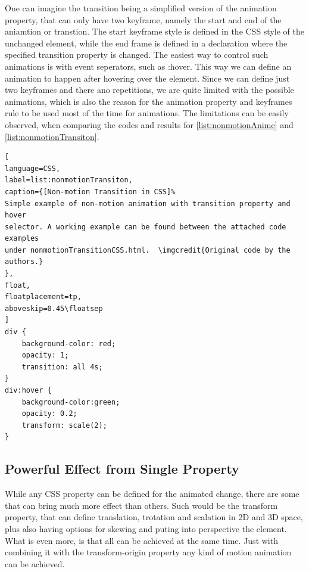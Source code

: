 One can imagine the transition being a simplified version of the animation 
property, that can only have two keyframe, namely the start and end of the 
aniamtion or transtion. The start keyframe style is defined in the CSS style of 
the unchanged element, while the end frame is defined in a declaration where 
the specified transition property is changed. The easiest way to control such 
animations is with event seperators, such as :hover. This way we can define an 
animation to happen after hovering over the element. Since we can define just 
two keyframes and there ano repetitions, we are quite limited with the possible 
animations, which is also the reason for the animation property and keyframes 
rule to be used most of the time for animations. The limitations can be easily 
observed, when comparing the codes and results for \ref{list:nonmotionAnime} 
and \ref{list:nonmotionTransiton}.

\begin{lstlisting}[
language=CSS,
label=list:nonmotionTransiton,
caption={[Non-motion Transition in CSS]%
Simple example of non-motion animation with transition property and hover 
selector. A working example can be found between the attached code examples 
under nonmotionTransitionCSS.html.  \imgcredit{Original code by the authors.}
},
float,
floatplacement=tp,
aboveskip=0.45\floatsep
]
div {
	background-color: red;
	opacity: 1;
	transition: all 4s;
}
div:hover {
	background-color:green;
	opacity: 0.2;
	transform: scale(2);
}
\end{lstlisting}



\subsection{Powerful Effect from Single Property} %
\label{sub:transformCSS}

While any CSS property can be defined for the animated change, there are some 
that can bring much more effect than others. Such would be the transform 
property, that can define translation, trotation and scalation in 2D and 3D 
space, plus also having options for skewing and puting into perspective the 
element. What is even more, is that all can be achieved at the same time. Just 
with combining it with the transform-origin property any kind of motion 
animation can be achieved.



